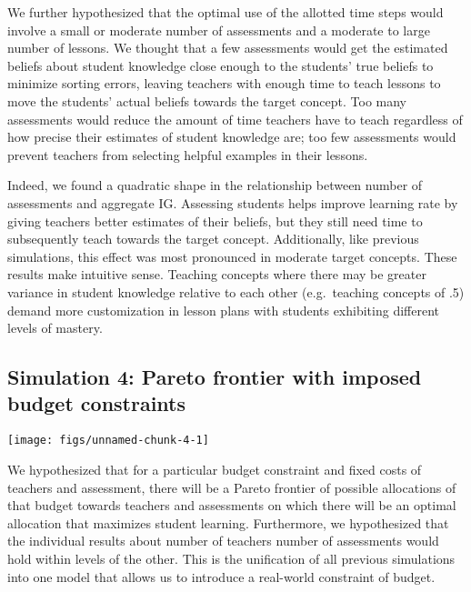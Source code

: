 \documentclass[10pt, letterpaper]{article}
\newenvironment{CodeChunk}{}{}
\begin{document}
We further hypothesized that the optimal use of the allotted time steps
would involve a small or moderate number of assessments and a moderate
to large number of lessons. We thought that a few assessments would get
the estimated beliefs about student knowledge close enough to the
students' true beliefs to minimize sorting errors, leaving teachers with
enough time to teach lessons to move the students' actual beliefs
towards the target concept. Too many assessments would reduce the amount
of time teachers have to teach regardless of how precise their estimates
of student knowledge are; too few assessments would prevent teachers
from selecting helpful examples in their lessons.

Indeed, we found a quadratic shape in the relationship between number of
assessments and aggregate IG. Assessing students helps improve learning
rate by giving teachers better estimates of their beliefs, but they
still need time to subsequently teach towards the target concept.
Additionally, like previous simulations, this effect was most pronounced
in moderate target concepts. These results make intuitive sense.
Teaching concepts where there may be greater variance in student
knowledge relative to each other (e.g.~teaching concepts of .5) demand
more customization in lesson plans with students exhibiting different
levels of mastery.

\subsection{Simulation 4: Pareto frontier with imposed budget
constraints}\label{simulation-4-pareto-frontier-with-imposed-budget-constraints}

\begin{CodeChunk}

\texttt{[image: figs/unnamed-chunk-4-1]} \end{CodeChunk}

We hypothesized that for a particular budget constraint and fixed costs
of teachers and assessment, there will be a Pareto frontier of possible
allocations of that budget towards teachers and assessments on which
there will be an optimal allocation that maximizes student learning.
Furthermore, we hypothesized that the individual results about number of
teachers number of assessments would hold within levels of the other.
This is the unification of all previous simulations into one model that
allows us to introduce a real-world constraint of budget.
\end{document}
